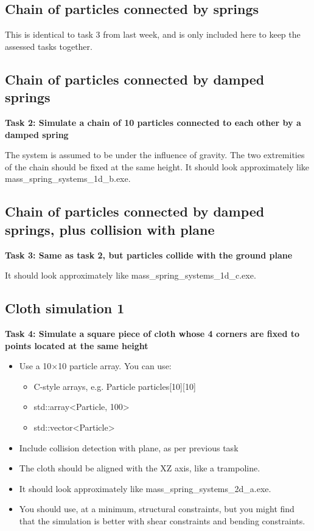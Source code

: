 \documentclass[12pt]{article}
\begin{document}
\subsection*{Chain of particles connected by springs}

This is identical to task 3 from last week, and is only included here to keep the assessed tasks together.

\subsection*{Chain of particles connected by damped springs}

\textbf{Task 2: Simulate a chain of 10 particles connected to each other by a damped spring}

The system is assumed to be under the influence of gravity. The two extremities of the chain should be fixed at the same height. It should look approximately like mass\_spring\_systems\_1d\_b.exe.

\subsection*{Chain of particles connected by damped springs, plus collision with plane}

\textbf{Task 3: Same as task 2, but particles collide with the ground plane}

It should look approximately like mass\_spring\_systems\_1d\_c.exe.

\subsection*{Cloth simulation 1}

\textbf{Task 4: Simulate a square piece of cloth whose 4 corners are fixed to points located at the same height}

\begin{itemize}
\item Use a 10$\times$10 particle array. You can use:
	\begin{itemize}
	\item C-style arrays, e.g. Particle particles[10][10]
	\item std::array<Particle, 100>
	\item std::vector<Particle>
	\end{itemize}
\item Include collision detection with plane, as per previous task
\item The cloth should be aligned with the XZ axis, like a trampoline. 
\item It should look approximately like mass\_spring\_systems\_2d\_a.exe.
\item You should use, at a minimum, structural constraints, but you might find that the simulation is better with shear constraints and bending constraints.
\end{itemize}
\end{document}
